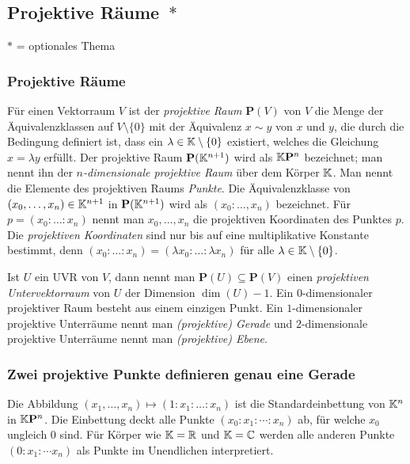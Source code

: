 \subsection{Projektive Räume\ $*$}

$\ast$ = optionales Thema

\subsubsection{Projektive Räume} 

\newcommand{\bP}{\mathbf{P}}

Für einen Vektorraum $V$ ist der \emph{projektive Raum} $\bP(V)$ von $V$ die Menge der Äquivalenzklassen auf $V \setminus \{0\}$ mit  der Äquivalenz $x \sim y$ von $x$ und $y$, die durch die Bedingung definiert ist, dass ein $\lambda \in \mathbb K \setminus \{0\}$ existiert,  welches die Gleichung $x = \lambda y$ erfüllt. Der projektive Raum $\bP(\K^{n+1})$ wird als $\K \bP^n$ bezeichnet; man nennt ihn der \emph{$n$-dimensionale projektive Raum} über dem Körper $\mathbb K$. Man nennt die Elemente des projektiven Raums \emph{Punkte}.  Die Äquivalenzklasse von $(x_0,\ldots,x_n) \in \mathbb K^{n+1}$ in $\bP( \K^{n+1})$ wird als $(x_0 : \ldots, x_n)$ bezeichnet. Für $p = (x_0 : \ldots : x_n)$ nennt man $x_0,\ldots,x_n$ die projektiven Koordinaten des Punktes $p$. Die \emph{projektiven Koordinaten} sind nur bis auf eine multiplikative Konstante bestimmt, denn $(x_0 : \ldots : x_n ) = (\lambda x_0 : \ldots : \lambda x_n)$ für alle $\lambda \in \mathbb K \setminus \{0\}$. 

Ist $U$ ein UVR von $V$, dann nennt man $\bP(U) \subseteq \bP(V)$ einen \emph{projektiven Untervektorraum} von $U$ der Dimension $\dim(U)-1$. Ein $0$-dimensionaler projektiver Raum besteht aus einem einzigen Punkt. Ein $1$-dimensionaler projektive Unterräume nennt man \emph{(projektive) Gerade} und $2$-dimensionale projektive Unterräume nennt man \emph{(projektive) Ebene}. 

\subsubsection{Zwei projektive Punkte definieren genau eine Gerade} 

Die Abbildung $(x_1,\ldots,x_n) \mapsto (1 : x_1 : \ldots :x_n)$ ist die Standardeinbettung von $\mathbb K^n$ in $\K \bP^n$. Die Einbettung deckt alle Punkte $(x_0 : x_1 : \cdots : x_n)$ ab, für welche $x_0$ ungleich $0$ sind. Für Körper wie $\mathbb K = \mathbb R$ und $\mathbb K = \mathbb C$ werden alle anderen Punkte $(0 : x_1 : \cdots x_n)$ als Punkte im Unendlichen interpretiert. 

